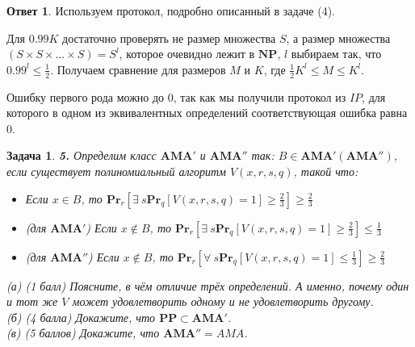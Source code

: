 \documentclass[a4paper]{article}
\theoremstyle{plain}
\newtheorem*{task}{Задача}
\theoremstyle{definition}
\newtheorem*{answer}{Ответ}
\begin{document}
\begin{answer}
Используем протокол, подробно описанный в задаче (4).


Для $0.99 K$ достаточно проверять не размер множества $S$, а размер множества $(S \times S \times \ldots \times S) = S^l$, которое очевидно лежит в $\mathbf{NP}$, $l$ выбираем так, что $0.99^l \leq \frac{1}{2}$. Получаем сравнение для размеров $M$ и $K$, где $\frac{1}{2} K^l \leq M \leq K^l$.

Ошибку первого рода можно до 0, так как мы получили протокол из $IP$, для которого в одном из эквивалентных определений соответствующая ошибка равна 0.  
\end{answer}


\begin{task} \textbf{5.}
Определим класс $\mathbf{AMA'}$ и $\mathbf{AMA''}$ так: $B \in \mathbf{AMA'} (\mathbf{AMA''})$, если существует полиномиальный алгоритм $V(x,r,s,q)$, такой что:
\begin{itemize}
\item Если $x \in B$, то $\mathbf{Pr}_r[\exists\ s \mathbf{Pr}_q [V(x,r,s,q)=1] \geq \frac{2}{3}] \geq \frac{2}{3}$
\item (для $\mathbf{AMA'}$) Если $x \notin B$, то $\mathbf{Pr}_r[\exists\ s \mathbf{Pr}_q [V(x,r,s,q)=1] \geq \frac{2}{3}] \leq \frac{1}{3}$
\item (для $\mathbf{AMA''}$) Если $x \notin B$, то $\mathbf{Pr}_r[\forall\ s \mathbf{Pr}_q [V(x,r,s,q)=1] \leq \frac{1}{3}] \geq \frac{2}{3}$
\end{itemize}
(а) (1 балл) Поясните, в чём отличие трёх определений. А именно, почему один и тот же $V$ может удовлетворить одному и не удовлетворить другому. \\
(б) (4 балла) Докажите, что $\mathbf{PP} \subset \mathbf{AMA'}$.\\
(в) (5 баллов) Докажите, что $\mathbf{AMA''}=AMA$.
\end{task}
\end{document}
